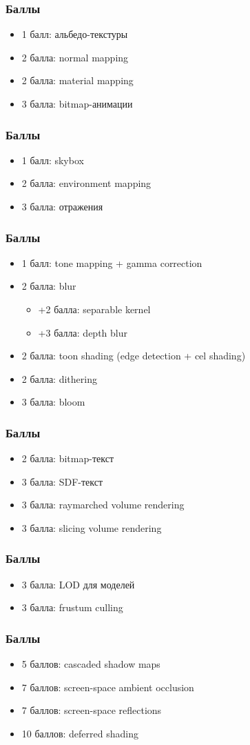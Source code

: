 \documentclass{beamer}
\begin{document}
\begin{frame}[fragile]
\frametitle{Баллы}
\begin{itemize}
\item 1 балл: альбедо-текстуры
\item 2 балла: normal mapping
\item 2 балла: material mapping
\item 3 балла: bitmap-анимации
\end{itemize}
\end{frame}

\begin{frame}[fragile]
\frametitle{Баллы}
\begin{itemize}
\item 1 балл: skybox
\item 2 балла: environment mapping
\item 3 балла: отражения
\end{itemize}
\end{frame}

\begin{frame}[fragile]
\frametitle{Баллы}
\begin{itemize}
\item 1 балл: tone mapping + gamma correction
\item 2 балла: blur
\begin{itemize}
\item +2 балла: separable kernel
\item +3 балла: depth blur
\end{itemize}
\item 2 балла: toon shading (edge detection + cel shading)
\item 2 балла: dithering
\item 3 балла: bloom
\end{itemize}
\end{frame}

\begin{frame}[fragile]
\frametitle{Баллы}
\begin{itemize}
\item 2 балла: bitmap-текст
\item 3 балла: SDF-текст
\item 3 балла: raymarched volume rendering
\item 3 балла: slicing volume rendering
\end{itemize}
\end{frame}

\begin{frame}[fragile]
\frametitle{Баллы}
\begin{itemize}
\item 3 балла: LOD для моделей
\item 3 балла: frustum culling
\end{itemize}
\end{frame}

\begin{frame}[fragile]
\frametitle{Баллы}
\begin{itemize}
\item 5 баллов: cascaded shadow maps
\item 7 баллов: screen-space ambient occlusion
\item 7 баллов: screen-space reflections
\item 10 баллов: deferred shading
\end{itemize}
\end{frame}
\end{document}
